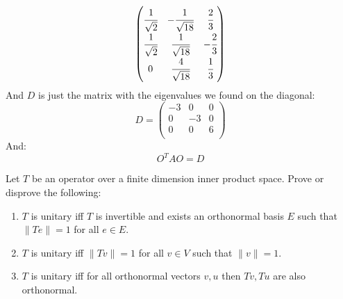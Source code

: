 \documentclass[11pt, a4paper]{article}
\begin{document}
\begin{solution}
\[\begin{pmatrix}
  \cfrac{1}{\sqrt{2}} & -\cfrac{1}{\sqrt{18}} & \cfrac{2}{3} \\
  \cfrac{1}{\sqrt{2}} & \cfrac{1}{\sqrt{18}} & -\cfrac{2}{3} \\
  0 & \cfrac{4}{\sqrt{18}} & \cfrac{1}{3}
  \end{pmatrix}
\]
And $D$ is just the matrix with the eigenvalues we found on the diagonal:
\[
  D = \begin{pmatrix}
    -3 & 0 & 0\\
    0 & -3 & 0\\
    0 & 0 & 6\\
    \end{pmatrix}
\]
And:
\[
  O^TAO = D
\]
\end{solution}

\begin{exercise}
Let $T$ be an operator over a finite dimension inner product space. 
Prove or disprove the following:
\begin{enumerate}
  \item[(1)] $T$ is unitary iff $T$ is invertible and exists an orthonormal
    basis $E$ such that $\|Te\|=1$ for all $e\in E$.
  \item[(2)] $T$ is unitary iff $\|Tv\|=1$ for all $v\in V$ such that 
    $\|v\|=1$.
  \item[(3)] $T$ is unitary iff for all orthonormal vectors $v,u$ then 
    $Tv,Tu$ are also orthonormal.
\end{enumerate}
\end{exercise}
\end{document}
